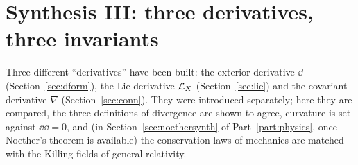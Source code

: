 \section{Synthesis III: three derivatives, three invariants}\label{sec:synth3}

\begin{synthesis}
Three different ``derivatives'' have been built: the exterior derivative $\dd$ (Section~\ref{sec:dform}), the Lie derivative $\mathcal{L}_X$ (Section~\ref{sec:lie}) and the covariant derivative $\nabla$ (Section~\ref{sec:conn}). %
They were introduced
separately; here they are compared, the three definitions of divergence are shown to agree, curvature is set against $\dd\dd=0$, and (in Section~\ref{sec:noethersynth} of Part~\ref{part:physics}, once Noether's theorem is available) the conservation laws of mechanics are matched with the Killing fields of general relativity.
\end{synthesis}




